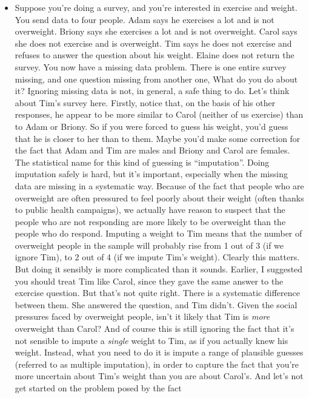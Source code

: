 \documentclass[
  a4paper,
]{book}
\begin{document}
\begin{itemize}
\item
  Suppose you're doing a survey, and you're interested in exercise and
  weight. You send data to four people. Adam says he exercises a lot and
  is not overweight. Briony says she exercises a lot and is not
  overweight. Carol says she does not exercise and is overweight. Tim
  says he does not exercise and refuses to answer the question about his
  weight. Elaine does not return the survey. You now have a missing data
  problem. There is one entire survey missing, and one question missing
  from another one, What do you do about it? Ignoring missing data is
  not, in general, a safe thing to do. Let's think about Tim's survey
  here. Firstly, notice that, on the basis of his other responses, he
  appear to be more similar to Carol (neither of us exercise) than to
  Adam or Briony. So if you were forced to guess his weight, you'd guess
  that he is closer to her than to them. Maybe you'd make some
  correction for the fact that Adam and Tim are males and Briony and
  Carol are females. The statistical name for this kind of guessing is
  ``imputation''. Doing imputation safely is hard, but it's important,
  especially when the missing data are missing in a systematic way.
  Because of the fact that people who are overweight are often pressured
  to feel poorly about their weight (often thanks to public health
  campaigns), we actually have reason to suspect that the people who are
  not responding are more likely to be overweight than the people who do
  respond. Imputing a weight to Tim means that the number of overweight
  people in the sample will probably rise from 1 out of 3 (if we ignore
  Tim), to 2 out of 4 (if we impute Tim's weight). Clearly this matters.
  But doing it sensibly is more complicated than it sounds. Earlier, I
  suggested you should treat Tim like Carol, since they gave the same
  answer to the exercise question. But that's not quite right. There is
  a systematic difference between them. She answered the question, and
  Tim didn't. Given the social pressures faced by overweight people,
  isn't it likely that Tim is \emph{more} overweight than Carol? And of
  course this is still ignoring the fact that it's not sensible to
  impute a \emph{single} weight to Tim, as if you actually knew his
  weight. Instead, what you need to do it is impute a range of plausible
  guesses (referred to as multiple imputation), in order to capture the
  fact that you're more uncertain about Tim's weight than you are about
  Carol's. And let's not get started on the problem posed by the fact

\end{itemize}
\end{document}

